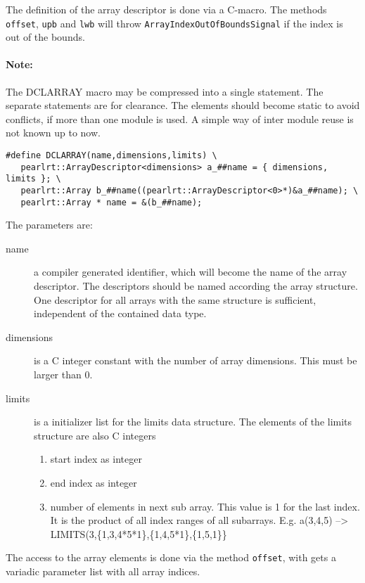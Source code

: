 The definition of the array descriptor is done via a C-macro.
The methods \verb|offset|, \verb|upb| and \verb|lwb| 
will throw \verb|ArrayIndexOutOfBoundsSignal|
if the index is out of the bounds.

\paragraph{Note:} The DCLARRAY macro may be compressed into a single statement.
The separate statements are for clearance.
The elements should become static to avoid conflicts, if more than 
one module is used. A simple way of inter module reuse is not known up to now.

\begin{verbatim}
#define DCLARRAY(name,dimensions,limits) \
   pearlrt::ArrayDescriptor<dimensions> a_##name = { dimensions, limits }; \
   pearlrt::Array b_##name((pearlrt::ArrayDescriptor<0>*)&a_##name); \
   pearlrt::Array * name = &(b_##name);
\end{verbatim}

The parameters are:
\begin{description}
\item[name] a compiler generated identifier, which will become
    the name  of the array descriptor. The descriptors should be 
    named according the array structure. One descriptor for all
    arrays with the same structure is sufficient, independent of
    the contained data type.
\item [dimensions] is a C integer constant with the number of 
   array dimensions. This must be larger than 0.
\item[limits] is a initializer list for the limits data structure.
   The elements of the limits structure are also C integers
   \begin{enumerate}
   \item start index as integer
   \item end index as integer
   \item number of elements in next sub array. This value is 1 for the 
     last index. It is the product of all index ranges of all subarrays.
     E.g. a(3,4,5) --> LIMITS(3,\{1,3,4*5*1\},\{1,4,5*1\},\{1,5,1\}\}
   \end{enumerate}
\end{description}

The access to the array elements is done via the method \verb|offset|, 
with gets a variadic parameter list with all array indices.

